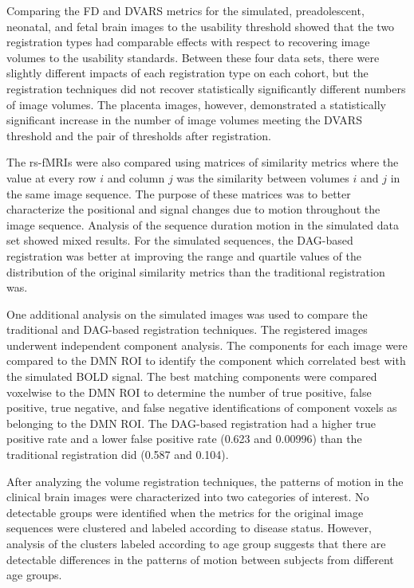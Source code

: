 Comparing the FD and DVARS metrics for the simulated, preadolescent, neonatal, and fetal brain images to the usability threshold showed that the two registration types had comparable effects with respect to recovering image volumes to the usability standards. Between these four data sets, there were slightly different impacts of each registration type on each cohort, but the registration techniques did not recover statistically significantly different numbers of image volumes. The placenta images, however, demonstrated a statistically significant increase in the number of image volumes meeting the DVARS threshold and the pair of thresholds after registration.

The rs-fMRIs were also compared using matrices of similarity metrics where the value at every row $i$ and column $j$ was the similarity between volumes $i$ and $j$ in the same image sequence. The purpose of these matrices was to better characterize the positional and signal changes due to motion throughout the image sequence. Analysis of the sequence duration motion in the simulated data set showed mixed results. For the simulated sequences, the DAG-based registration was better at improving the range and quartile values of the distribution of the original similarity metrics than the traditional registration was.

One additional analysis on the simulated images was used to compare the traditional and DAG-based registration techniques. The registered images underwent independent component analysis. The components for each image were compared to the DMN ROI to identify the component which correlated best with the simulated BOLD signal. The best matching components were compared voxelwise to the DMN ROI to determine the number of true positive, false positive, true negative, and false negative identifications of component voxels as belonging to the DMN ROI. The DAG-based registration had a higher true positive rate and a lower false positive rate (0.623 and 0.00996) than the traditional registration did (0.587 and 0.104).

After analyzing the volume registration techniques, the patterns of motion in the clinical brain images were characterized into two categories of interest. No detectable groups were identified when the metrics for the original image sequences were clustered and labeled according to disease status. However, analysis of the clusters labeled according to age group suggests that there are detectable differences in the patterns of motion between subjects from different age groups.
